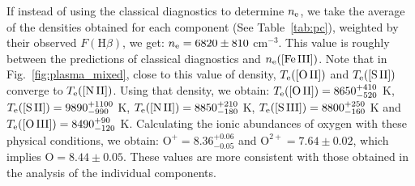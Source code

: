 \documentclass[twocolumn,linenumbers]{aastex63}
\newcommand{\jorge}[1]{{\color{magenta}J: #1}}
\newcommand{\cesar}[1]{{\color{red}C: #1}}
\begin{document}

If instead of using the classical diagnostics to determine $n_{\rm e}$, we take the average of the densities obtained for each component (See Table~\ref{tab:pc}), weighted by their observed $F(\text{H}\beta)$, we get: $n_{\rm e}=6820 \pm 810$ cm$^{-3}$. This value is roughly between the predictions of classical  diagnostics and $n_{\rm e}(\text{[Fe\thinspace III]})$. Note that in Fig.~\ref{fig:plasma_mixed}, close to this value of density, $T_{\rm e}(\text{[O\thinspace II]})$ and $T_{\rm e}(\text{[S\thinspace II]})$ converge to $T_{\rm e}(\text{[N\thinspace II]})$.  Using that density, we obtain: $T_{\rm e}(\text{[O\thinspace II]})=8650^{+410} _{-520}$ K, $T_{\rm e}(\text{[S\thinspace II]})=9890^{+1100} _{-990}$ K, $T_{\rm e}(\text{[N\thinspace II]})=8850^{+210} _{-180}$ K, $T_{\rm e}(\text{[S\thinspace III]})=8800^{+250} _{-160}$ K and $T_{\rm e}(\text{[O\thinspace III]})=8490^{+90} _{-120}$ K. Calculating the ionic abundances of oxygen with these physical conditions, we obtain: $\text{O}^{+}=8.36^{+0.06} _{-0.05}$ and  $\text{O}^{2+}=7.64 \pm 0.02$, which implies $\text{O}=8.44 \pm 0.05$. These values are more consistent with those obtained in the analysis of the individual components. 
\end{document}
